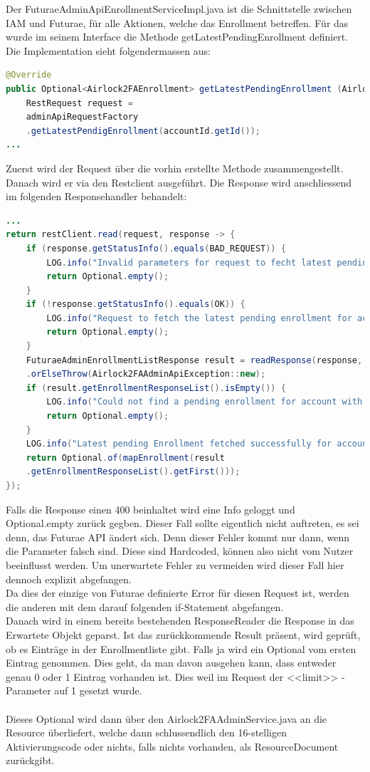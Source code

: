 Der FuturaeAdminApiEnrollmentServiceImpl.java ist die Schnittstelle zwischen IAM und Futurae, für alle Aktionen, welche das Enrollment betreffen. Für das wurde im seinem Interface die Methode \flqq getLatestPendingEnrollment\frqq{} definiert. Die Implementation sieht folgendermassen aus:
\begin{lstlisting}[language=Java]
@Override
public Optional<Airlock2FAEnrollment> getLatestPendingEnrollment (Airlock2FAAccountId accountId) {
	RestRequest request = 
	adminApiRequestFactory
	.getLatestPendigEnrollment(accountId.getId());
...
\end{lstlisting}
Zuerst wird der Request über die vorhin erstellte Methode zusammengestellt.
Danach wird er via den Restclient ausgeführt. Die Response wird anschliessend im folgenden Responsehandler behandelt:
\begin{lstlisting}[language=Java]
...
return restClient.read(request, response -> {
	if (response.getStatusInfo().equals(BAD_REQUEST)) {
		LOG.info("Invalid parameters for request to fecht latest pending enrollment for account with id: " + accountId.getId());
		return Optional.empty();
	}
	if (!response.getStatusInfo().equals(OK)) {
		LOG.info("Request to fetch the latest pending enrollment for account with id '" + accountId.getId() + "' failed with code: " + response.getStatusInfo());
		return Optional.empty();
	}
	FuturaeAdminEnrollmentListResponse result = readResponse(response, FuturaeAdminEnrollmentListResponse.class, request)
	.orElseThrow(Airlock2FAAdminApiException::new);
	if (result.getEnrollmentResponseList().isEmpty()) {
		LOG.info("Could not find a pending enrollment for account with id: " + accountId.getId());
		return Optional.empty();
	}
	LOG.info("Latest pending Enrollment fetched successfully for account with id: " + accountId.getId());
	return Optional.of(mapEnrollment(result
	.getEnrollmentResponseList().getFirst()));
});
\end{lstlisting}
Falls die Response einen 400 beinhaltet wird eine Info geloggt und Optional.empty zurück gegben. Dieser Fall sollte eigentlich nicht auftreten, es sei denn, das Futurae API ändert sich. Denn dieser Fehler kommt nur dann, wenn die Parameter falsch sind. Diese sind Hardcoded, können also nicht vom Nutzer beeinflusst werden. Um unerwartete Fehler zu vermeiden wird dieser Fall hier dennoch explizit abgefangen.\\
Da dies der einzige von Futurae definierte Error für diesen Request ist, werden die anderen mit dem darauf folgenden if-Statement abgefangen.\\
Danach wird in einem bereits bestehenden ResponseReader die Response in das Erwartete Objekt geparst. Ist das zurückkommende Result präsent, wird geprüft, ob es Einträge in der Enrollmentliste gibt. Falls ja wird ein Optional vom ersten Eintrag genommen. Dies geht, da man davon ausgehen kann, dass entweder genau 0 oder 1 Eintrag vorhanden ist. Dies weil im Request der <<limit>> -Parameter auf 1 gesetzt wurde.\\
\\
Dieses Optional wird dann über den Airlock2FAAdminService.java an die Resource überliefert, welche dann schlussendlich den 16-stelligen Aktivierungscode oder nichts, falls nichts vorhanden, als ResourceDocument zurückgibt.
